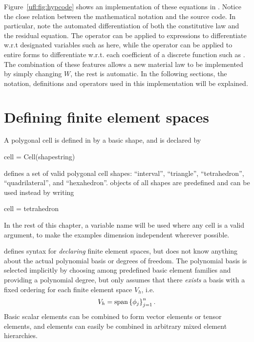 Figure~\ref{ufl:fig:hypcode} shows an implementation of these
equations in \ufl{}.  Notice the close relation between the
mathematical notation and the \ufl{} source code. In particular, note
the automated differentiation of both the constitutive law and the
residual equation. The operator  can be applied to
expressions to differentiate w.r.t designated variables such as
 here, while the operator  can be applied
to entire forms to differentiate w.r.t. each coefficient of a discrete
function such as .  The combination of these features allows
a new material law to be implemented by simply changing $W$, the rest
is automatic.  In the following sections, the notation, definitions
and operators used in this implementation will be explained.

\section{Defining finite element spaces} \label{ufl:sec:elements}
A polygonal cell is defined in \ufl{} by a basic shape, and is declared by
\begin{python}
cell = Cell(shapestring)
\end{python}
\ufl{} defines a set of valid polygonal cell shapes: ``interval'',
``triangle'', ``tetrahedron'', ``quadrilateral'', and ``hexahedron''.
 objects of all shapes are predefined and can be used
instead by writing
\begin{python}
cell = tetrahedron
\end{python}
In the rest of this chapter, a variable name  will be used
where any cell is a valid argument, to make the examples dimension
independent wherever possible.

\ufl{} defines syntax for \emph{declaring} finite element spaces, but
does not know anything about the actual polynomial basis or degrees of
freedom. The polynomial basis is selected implicitly by choosing among
predefined basic element families and providing a polynomial degree,
but \ufl{} only assumes that there \emph{exists} a basis with a fixed
ordering for each finite element space $V_h$, i.e.
\begin{align}
V_h = \operatorname{span}\left\{ \phi_j \right\}_{j=1}^{n}.
\end{align}
Basic scalar elements can be combined to form vector elements or
tensor elements, and elements can easily be combined in arbitrary
mixed element hierarchies.

